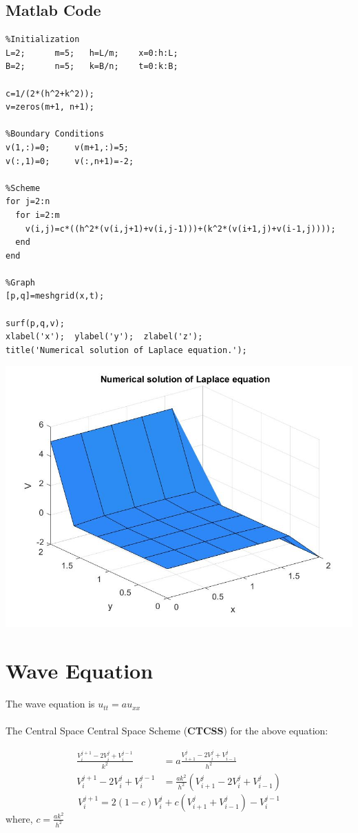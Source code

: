 \section{Matlab Code}
\begin{verbatim}
%Initialization
L=2;      m=5;   h=L/m;    x=0:h:L;
B=2;      n=5;   k=B/n;    t=0:k:B;

c=1/(2*(h^2+k^2));
v=zeros(m+1, n+1);

%Boundary Conditions
v(1,:)=0;     v(m+1,:)=5;
v(:,1)=0;     v(:,n+1)=-2;

%Scheme
for j=2:n
  for i=2:m
    v(i,j)=c*((h^2*(v(i,j+1)+v(i,j-1)))+(k^2*(v(i+1,j)+v(i-1,j))));
  end
end

%Graph
[p,q]=meshgrid(x,t);

surf(p,q,v);
xlabel('x');  ylabel('y');  zlabel('z');
title('Numerical solution of Laplace equation.');
\end{verbatim}
\includegraphics[scale=0.32]{laplace.jpg}

\chapter{Wave Equation}

The wave equation is \hspace{5mm} \(u_{tt}=au_{xx}\) \\ \\

The Central Space Central Space Scheme (\textbf{CTCSS}) for the above equation:

\begin{align*}
  \frac{V_i^{j+1}-2V_i^j+V_i^{j-1}}{k^2} &=  a \frac{V_{i+1}^j-2V_i^j+V_{i-1}^j}{h^2}\\
  V_i^{j+1}-2V_i^j+V_i^{j-1} &= \frac{ak^2}{h^2}(V_{i+1}^j-2V_i^j+V_{i-1}^j)
 \end{align*}
\begin{equation}
  V_i^{j+1} = 2(1-c)V_i^j + c(V_{i+1}^j+V_{i-1}^j)  - V_i^{j-1}
\end{equation}
where, \hspace{5mm} \(c=\frac{ak^2}{h^2}\) \\

